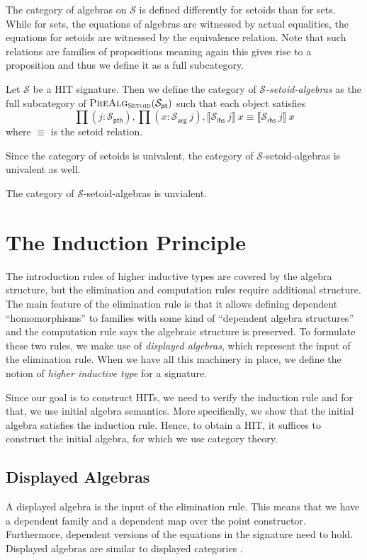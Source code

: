 \documentclass[9pt]{entcs}
\newcommand{\category}[1]{\textsc{#1}}
\newcommand{\deprod}[3]{\prod(#1 : #2), #3} %
\newcommand{\0}{\textbf{0}} %
\newcommand{\setoids}{\category{Setoid}} %
\newcommand{\pt}[0]{\textsf{pt}}
\newcommand{\pthI}[0]{\textsf{pth}}
\newcommand{\pthA}[0]{\textsf{arg}}
\newcommand{\pthlh}[0]{\textsf{lhs}}
\newcommand{\pthrh}[0]{\textsf{rhs}}
\newcommand{\pointc}[1]{#1_{\pt}} %
\newcommand{\pathI}[1]{#1_{\pthI}} %
\newcommand{\pathA}[1]{#1_{\pthA}} %
\newcommand{\pathlh}[1]{#1_{\pthlh}} %
\newcommand{\pathrh}[1]{#1_{\pthrh}} %
\newcommand{\sig}{\mathcal{S}} %
\newcommand{\semE}[1]{\llbracket #1 \rrbracket} %
\newcommand{\prealgst}[1]{\category{PreAlg}_{\setoids}(#1)} %
\begin{document}
The category of algebras on $\sig$ is defined differently for setoids than for sets.
While for sets, the equations of algebras are witnessed by actual equalities, the equations for setoids are witnessed by the equivalence relation.
Note that such relations are families of propositions meaning again this gives rise to a proposition and thus we define it as a full subcategory.

\begin{definition}
Let $\sig$ be a HIT signature.
Then we define the category of \emph{$\sig$-setoid-algebras} as the full subcategory of $\prealgst{\pointc{\sig}}$ such that each object satisfies
\[
\deprod{j}{\pathI{\sig}}{\deprod{x}{\pathA{\sig} \> j}{\semE{\pathlh{\sig} \> j} \> x \equiv \semE{\pathrh{\sig} \> j} \> x}}
\]
where $\equiv$  is the setoid relation.
\end{definition}

Since the category of setoids is univalent, the category of $\sig$-setoid-algebras is univalent as well.

\begin{proposition}
The category of $\sig$-setoid-algebras is unvialent.
\end{proposition}

\section{The Induction Principle}
\label{sec:induction}
The introduction rules of higher inductive types are covered by the algebra structure, but the elimination and computation rules require additional structure.
The main feature of the elimination rule is that it allows defining dependent ``homomorphisms'' to families with some kind of ``dependent algebra structures'' and the computation rule says the algebraic structure is preserved.
To formulate these two rules, we make use of \emph{displayed algebras}, which represent the input of the elimination rule.
When we have all this machinery in place, we define the notion of \emph{higher inductive type} for a signature.

Since our goal is to construct HITs, we need to verify the induction rule and for that, we use initial algebra semantics.
More specifically, we show that the initial algebra satisfies the induction rule.
Hence, to obtain a HIT, it suffices to construct the initial algebra, for which we use category theory.

\subsection{Displayed Algebras}
\label{ref:induction}
A displayed algebra is the input of the elimination rule.
This means that we have a dependent family and a dependent map over the point constructor.
Furthermore, dependent versions of the equations in the signature need to hold.
Displayed algebras are similar to displayed categories \cite{AhrensL19}.
\end{document}
